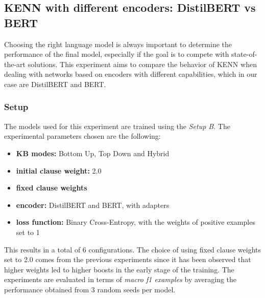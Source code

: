 \subsection{KENN with different encoders: DistilBERT vs BERT} \label{distilbert_vs_bert}
Choosing the right language model is always important to determine the performance of the final model, especially if the goal is to compete with state-of-the-art solutions. This experiment aims to compare the behavior of KENN when dealing with networks based on encoders with different capabilities, which in our case are DistilBERT and BERT.

\subsubsection{Setup}
The models used for this experiment are trained using the \textit{Setup B}. The experimental parameters chosen are the following:
\begin{itemize}
    \item \textbf{KB modes:} Bottom Up, Top Down and Hybrid
    \item \textbf{initial clause weight:} 2.0
    \item \textbf{fixed clause weights}
    \item \textbf{encoder:} DistilBERT and BERT, with adapters
    \item \textbf{loss function:} Binary Cross-Entropy, with the weights of positive examples set to 1
\end{itemize}
This results in a total of 6 configurations. The choice of using fixed clause weights set to 2.0 comes from the previous experiments since it has been observed that higher weights led to higher boosts in the early stage of the training. The experiments are evaluated in terms of \textit{macro f1 examples} by averaging the performance obtained from 3 random seeds per model.

